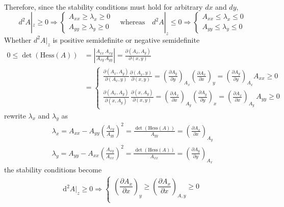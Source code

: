 \begin{principle}
\begin{tui}
\begin{align*}
\end{align*}
    Therefore, since the stability conditions must hold for arbitrary \( dx \) and \( dy \),  
    \[
    d^2A|_z \geq 0 \Rightarrow 
        \begin{cases} A_{xx} \geq \lambda_x \geq 0 \\ 
        A_{yy} \geq \lambda_y \geq 0 \end{cases} 
        \quad \text{whereas} \quad 
        d^2A|_z \leq 0 \Rightarrow 
        \begin{cases} A_{xx} \leq \lambda_x \leq 0 \\ 
        A_{yy} \leq \lambda_y \leq 0 \end{cases}
    \]
Whether \( d^2 A|_z \) is positive semidefinite or negative semidefinite
\begin{align*}
0 \leq \det(\text{Hess}(A)) &= \left| \frac{A_{xx} \, A_{xy}}{A_{xy} \, A_{yy}} \right| = \frac{\partial (A_{x}, A_{y})}{\partial (x, y)}
\\
&=\begin{cases}
    \frac{\partial (A_{x},A_{y})}{\partial (A_{x},y)}\frac{\partial (A_{x},y)}{\partial (x,y)}
    =\left(\frac{\partial A_{y}}{\partial y}\right)_{A_{x}}
    \left(\frac{\partial A_{x}}{\partial x}\right)_{y}
    =\left(\frac{\partial A_{y}}{\partial y}\right)_{A_{x}}A_{xx}\geq 0
    \\
    \frac{\partial (A_{x},A_{y})}{\partial (x,A_{y})}\,\frac{\partial (x,A_{y})}{\partial (x,y)}
    =\left(\frac{\partial A_{x}}{\partial x}\right)_{A_{y}}
    \left(\frac{\partial A_{y}}{\partial y}\right)_{x}
    =\left(\frac{\partial A_{x}}{\partial x}\right)_{A_{y}}\,A_{yy}\geq 0
\end{cases}
\end{align*}
rewrite \(\lambda_x\) and \(\lambda_y\) as
\begin{gather*}
    \lambda_x = A_{xx} - A_{yy} \left( \frac{A_{xy}}{A_{yy}} \right)^2 
    = \frac{\det(\text{Hess}(A))}{A_{yy}} 
    = \left( \frac{\partial A_{x}}{\partial x} \right)_{A_{y}}
    \\
    \lambda_y = A_{yy} - A_{xx} \left( \frac{A_{xy}}{A_{xx}} \right)^2 
    = \frac{\det(\text{Hess}(A))}{A_{xx}} 
    = \left( \frac{\partial A_{y}}{\partial y} \right)_{A_{x}}
\end{gather*}
the stability conditions become
\begin{align*}
\mathrm{d}^2A|_z\geq 0\Rightarrow
    \begin{cases}
        \left(\dfrac{\partial A_{x}}{\partial x}\right)_y
        \geq \left(\dfrac{\partial A_{x}}{\partial x}\right)_{A,y}\geq 0\\

\end{cases}
\end{align*}
\end{tui}
\end{principle}

